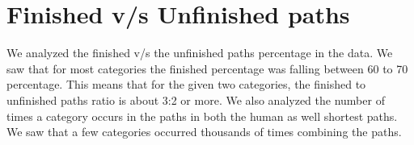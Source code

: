\documentclass[11pt]{article}
\begin{document}
\section{Finished v/s Unfinished paths}
We analyzed the finished v/s the unfinished paths percentage in the data. We saw that for most categories the finished percentage was falling between 60 to 70 percentage. This means that for the given two categories, the finished to unfinished paths ratio is about 3:2 or more. We also analyzed the number of times a category occurs in the paths in both the human as well shortest paths. We saw that a few categories occurred thousands of times combining the paths.
\end{document}
